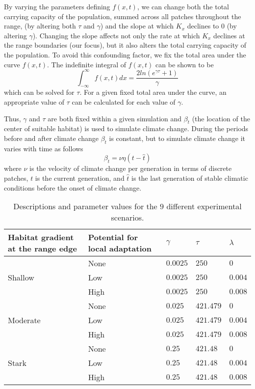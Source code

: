 \documentclass[11pt]{article}
\begin{document}
By varying the parameters defining $f(x,t)$, we can change both the total carrying capacity of the population, summed across all patches throughout the range, (by altering both $\tau$ and $\gamma$) and the slope at which $K_{x}$ declines to $0$ (by altering $\gamma$). Changing the slope affects not only the rate at which $K_{x}$ declines at the range boundaries (our focus), but it also alters the total carrying capacity of the population. To avoid this confounding factor, we fix the total area under the curve $f(x,t)$. The indefinite integral of $f(x,t)$ can be shown to be
\begin{equation}
\int_{-\infty}^{\infty}f(x,t)dx = \frac{2ln(e^{\gamma\tau}+1)}{\gamma}
\end{equation}
which can be solved for $\tau$. For a given fixed total area under the curve, an appropriate value of $\tau$ can be calculated for each value of $\gamma$.

Thus, $\gamma$ and $\tau$ are both fixed within a given simulation and $\beta_{t}$ (the location of the center of suitable habitat) is used to simulate climate change. During the periods before and after climate change $\beta_{t}$ is constant, but to simulate climate change it varies with time as follows
\begin{equation}
\beta_{t}=\nu\eta(t-\hat{t})
\end{equation}
where $\nu$ is the velocity of climate change per generation in terms of discrete patches, $t$ is the current generation, and $\hat{t}$ is the last generation of stable climatic conditions before the onset of climate change.

\begin{table}
\renewcommand{\arraystretch}{1.5}
  \begin{tabular}{ p{4cm} | p{4cm} | p{1.5cm} | p{1.5cm} | p{1.5cm} }
    \hline
    Habitat gradient at the range edge & Potential for local adaptation & $\gamma$ & $\tau$ & $\lambda$  \\ \hline \hline
     & None & $0.0025$ & $250$ & $0$ \\
    Shallow & Low & $0.0025$ & $250$ & $0.004$ \\
     & High & $0.0025$ & $250$ & $0.008$ \\ \hline
     & None & $0.025$ & $421.479$ & $0$ \\
    Moderate & Low & $0.025$ & $421.479$ & $0.004$ \\
     & High & $0.025$ & $421.479$ & $0.008$ \\ \hline
     & None & $0.25$ & $421.48$ & $0$ \\
    Stark & Low & $0.25$ & $421.48$ & $0.004$ \\
     & High & $0.25$ & $421.48$ & $0.008$ \\ 
    \hline
  \end{tabular}
\caption[LoF entry]{Descriptions and parameter values for the $9$ different experimental scenarios.}
\label{table:Scenarios}
\end{table}
\end{document}
